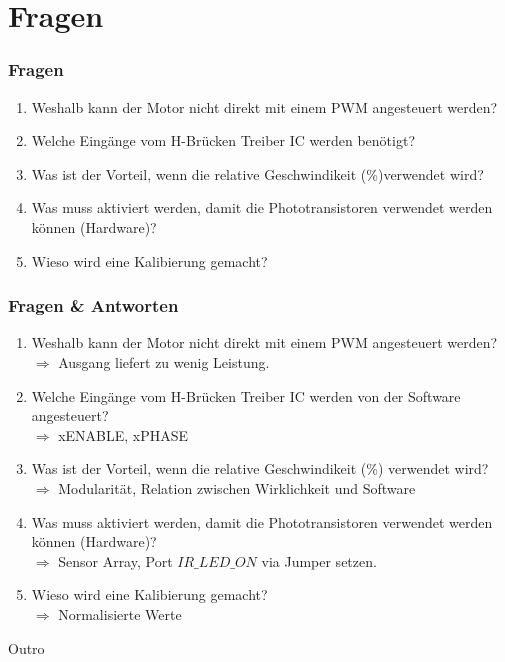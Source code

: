 \documentclass{beamer}
\begin{document}
\section{Fragen} %
\begin{frame}
	\frametitle{Fragen}
	\begin{enumerate}
		\item{Weshalb kann der Motor nicht direkt mit einem PWM angesteuert werden?}
		\item{Welche Eingänge vom H-Brücken Treiber IC werden benötigt?}
		\item{Was ist der Vorteil, wenn die relative Geschwindikeit (\%)verwendet wird?}
		\item{Was muss aktiviert werden, damit die Phototransistoren verwendet werden können (Hardware)?}
		\item{Wieso wird eine Kalibierung gemacht?}
	\end{enumerate}
\end{frame}
\begin{frame}
	\frametitle{Fragen \& Antworten}
	\begin{enumerate}
		\item{Weshalb kann der Motor nicht direkt mit einem PWM angesteuert werden?}
		\\$\Rightarrow$ Ausgang liefert zu wenig Leistung.
		\item{Welche Eingänge vom H-Brücken Treiber IC werden von der Software angesteuert?}
		\\$\Rightarrow$ xENABLE, xPHASE
		\item{Was ist der Vorteil, wenn die relative Geschwindikeit (\%) verwendet wird?}
		\\$\Rightarrow$ Modularität, Relation zwischen Wirklichkeit und Software
		\item{Was muss aktiviert werden, damit die Phototransistoren verwendet werden können (Hardware)?}
		\\$\Rightarrow$ Sensor Array, Port $IR\_LED\_ON$ via Jumper setzen.
		\item{Wieso wird eine Kalibierung gemacht?}
		\\$\Rightarrow$ Normalisierte Werte
	\end{enumerate}
\end{frame}
\begin{frame}
	\Huge{\centerline{Outro}}
\end{frame}
\end{document}
